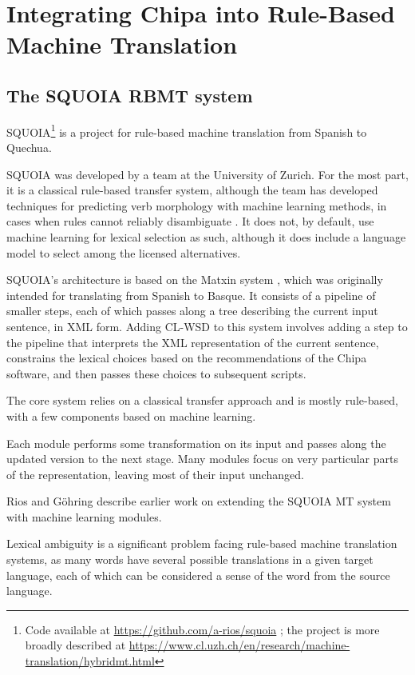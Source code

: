 \section{Integrating Chipa into Rule-Based Machine Translation}


\subsection{The SQUOIA RBMT system}
SQUOIA\footnote{Code available at \url{https://github.com/a-rios/squoia} ;
the project is more broadly described at
\url{https://www.cl.uzh.ch/en/research/machine-translation/hybridmt.html}}
is a project for rule-based machine translation from Spanish to Quechua.

SQUOIA was developed by a team at the University of Zurich. For the most
part, it is a classical rule-based transfer system, although the team has
developed techniques for predicting verb morphology with machine
learning methods, in cases when rules cannot reliably disambiguate
\cite{riosgonzales-gohring:2013:HyTra}. It does not, by default, use machine
learning for lexical selection as such, although it does include a language
model to select among the licensed alternatives.

SQUOIA's architecture is based on the Matxin system \cite{matxin2005}, which
was originally intended for translating from Spanish to Basque.
It consists of a pipeline of smaller steps, each of which passes along a tree
describing the current input sentence, in XML form. Adding CL-WSD to this
system involves adding a step to the pipeline that interprets the XML
representation of the current sentence, constrains the lexical choices based on
the recommendations of the Chipa software, and then passes these choices to
subsequent scripts.

The core system relies on a classical transfer approach and is mostly
rule-based, with a few components based on machine learning.

Each module performs some transformation on its input and
passes along the updated version to the next stage. Many modules focus on very
particular parts of the representation, leaving most of their input unchanged.

Rios and G\"{o}hring \cite{riosgonzales-gohring:2013:HyTra} describe
earlier work on extending the SQUOIA MT system with machine learning modules.

Lexical ambiguity is a significant problem facing rule-based machine
translation systems, as many words have several possible translations in a
given target language, each of which can be considered a sense of the word from
the source language.

